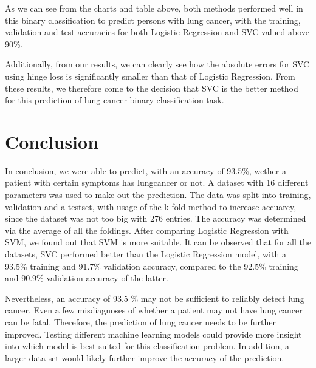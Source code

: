 \documentclass[a4paper,12pt]{article}
\begin{document}
\begin{center}
\begin{tabular}{l}
\\
\end{tabular}
\end{center}



As we can see from the charts and table above, both methods performed well in this binary classification to predict persons with lung cancer, with the training, validation and test accuracies for both Logistic Regression and SVC valued above 90\%.

Additionally, from our results, we can clearly see how the absolute errors for SVC using hinge loss is significantly smaller than that of Logistic Regression.
From these results, we therefore come to the decision that SVC is the better method for this prediction of lung cancer binary classification task.

\section{Conclusion}
\label{sec:org2a89ab1}

In conclusion, we were able to predict, with an accuracy of 93.5\%, wether a patient with certain symptoms has lungcancer or not.
A dataset with 16 different parameters was used to make out the prediction.
The data was split into training, validation and a testset, with usage of the k-fold method to increase accuarcy, since the dataset was not too big with 276 entries.
The accuracy was determined via the average of all the foldings.
After comparing Logistic Regression with SVM, we found out that SVM is more suitable.
It can be observed that for all the datasets, SVC performed better than the Logistic Regression model, with a 93.5\% training and 91.7\% validation accuracy, compared to the 92.5\% training and 90.9\% validation accuracy of the latter.

Nevertheless, an accuracy of 93.5 \% may not be sufficient to reliably detect lung cancer.
Even a few misdiagnoses of whether a patient may not have lung cancer can be fatal. Therefore, the prediction of lung cancer needs to be further improved.
Testing different machine learning models could provide more insight into which model is best suited for this classification problem.
In addition, a larger data set would likely further improve the accuracy of the prediction.
\end{document}
